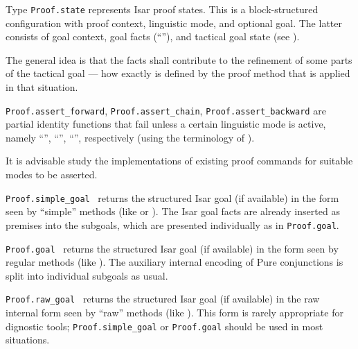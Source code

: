 \begin{isabellebody}
\begin{isamarkuptext}
  \begin{description}

  \item Type \verb|Proof.state| represents Isar proof states.
  This is a block-structured configuration with proof context,
  linguistic mode, and optional goal.  The latter consists of goal
  context, goal facts (``''), and tactical goal state
  (see ).

  The general idea is that the facts shall contribute to the
  refinement of some parts of the tactical goal --- how exactly is
  defined by the proof method that is applied in that situation.

  \item \verb|Proof.assert_forward|, \verb|Proof.assert_chain|, \verb|Proof.assert_backward| are partial identity functions that fail
  unless a certain linguistic mode is active, namely ``'', ``'', ``'', respectively (using the terminology of
  \cite{isabelle-isar-ref}).

  It is advisable study the implementations of existing proof commands
  for suitable modes to be asserted.

  \item \verb|Proof.simple_goal|~ returns the structured
  Isar goal (if available) in the form seen by ``simple'' methods
  (like \hyperlink{method.simp}{\mbox{}} or \hyperlink{method.blast}{\mbox{}}).  The Isar goal facts are
  already inserted as premises into the subgoals, which are presented
  individually as in \verb|Proof.goal|.

  \item \verb|Proof.goal|~ returns the structured Isar
  goal (if available) in the form seen by regular methods (like
  \hyperlink{method.rule}{\mbox{}}).  The auxiliary internal encoding of Pure
  conjunctions is split into individual subgoals as usual.

  \item \verb|Proof.raw_goal|~ returns the structured
  Isar goal (if available) in the raw internal form seen by ``raw''
  methods (like \hyperlink{method.induct}{\mbox{}}).  This form is rarely appropriate
  for dignostic tools; \verb|Proof.simple_goal| or \verb|Proof.goal|
  should be used in most situations.


\end{description}
\end{isamarkuptext}
\end{isabellebody}
